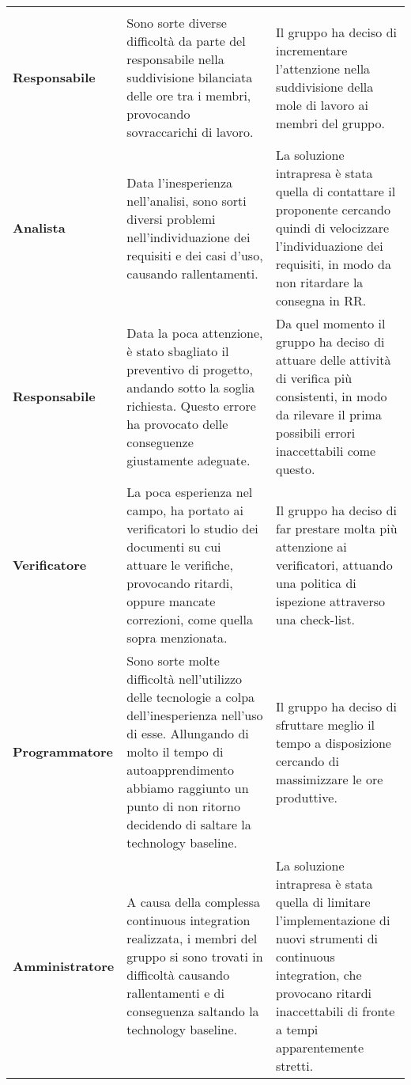 \documentclass[../piano-di-qualifica.tex]{subfiles}
\begin{document}
  \begin{longtable}[H]{>{\centering\bfseries}m{4cm} >{\centering\arraybackslash}m{6cm} >{\centering\arraybackslash}m{6cm}}
    \rowcolor{darkgray!90!}
    \color{white}{\textbf{Ruolo}} & \color{white}{\textbf{Problema}} & \color{white}{\textbf{Soluzione}} \\
    Responsabile & Sono sorte diverse difficoltà da parte del responsabile nella suddivisione bilanciata delle ore tra i membri, provocando sovraccarichi di lavoro. & Il gruppo ha deciso di incrementare l'attenzione nella suddivisione della mole di lavoro ai membri del gruppo. \\
    Analista & Data l'inesperienza nell'analisi, sono sorti diversi problemi nell'individuazione dei requisiti e dei casi d'uso, causando rallentamenti. & La soluzione intrapresa è stata quella di contattare il proponente cercando quindi di velocizzare l'individuazione dei requisiti, in modo da non ritardare la consegna in RR. \\
    Responsabile & Data la poca attenzione, è stato sbagliato il preventivo di progetto, andando sotto la soglia richiesta. Questo errore ha provocato delle conseguenze giustamente adeguate. & Da quel momento il gruppo ha deciso di attuare delle attività di verifica più consistenti, in modo da rilevare il prima possibili errori inaccettabili come questo. \\
    Verificatore & La poca esperienza nel campo, ha portato ai verificatori lo studio dei documenti su cui attuare le verifiche, provocando ritardi, oppure mancate correzioni, come quella sopra menzionata. & Il gruppo ha deciso di far prestare molta più attenzione ai verificatori, attuando una politica di ispezione attraverso una check-list. \\
    Programmatore & Sono sorte molte difficoltà nell'utilizzo delle tecnologie a colpa dell'inesperienza nell'uso di esse. Allungando di molto il tempo di autoapprendimento abbiamo raggiunto un punto di non ritorno decidendo di saltare la technology baseline. & Il gruppo ha deciso di sfruttare meglio il tempo a disposizione cercando di massimizzare le ore produttive. \\
    Amministratore & A causa della complessa continuous integration realizzata, i membri del gruppo si sono trovati in difficoltà causando rallentamenti e di conseguenza saltando la technology baseline. & La soluzione intrapresa è stata quella di limitare l'implementazione di nuovi strumenti di continuous integration, che provocano ritardi inaccettabili di fronte a tempi apparentemente stretti. \\
  \end{longtable}
\end{document}
